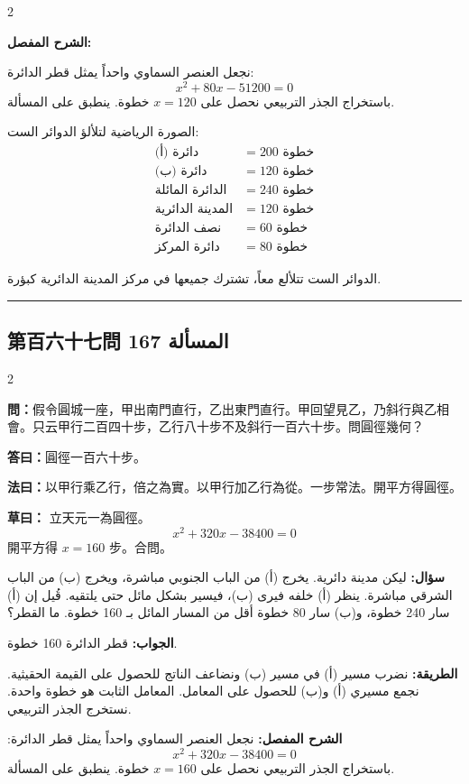 \documentclass[11pt,a4paper]{article}
\newcommand{\ar}[1]{\arabicfont\beginR #1\endR}
\newcommand{\arb}[1]{\textbf{\arabicfont\beginR #1\endR}}
\newcommand{\longline}{\noindent\rule{\textwidth}{0.4pt}}
\newcommand{\arnote}[1]{\textcolor{arabicblue}{\ar{#1}}}
\newcommand{\wen}[1]{\par\noindent\textbf{\textcolor{probcolor}{問：}}{#1}\par}
\newcommand{\da}[1]{\par\noindent\textbf{\textcolor{anscolor}{答曰：}}{#1}\par}
\newcommand{\fayue}[1]{\par\noindent\textbf{\textcolor{methodcolor}{法曰：}}{#1}\par}
\newcommand{\caoyue}[1]{\par\noindent\textbf{草曰：}{#1}\par}
\newcommand{\arwen}[1]{\par\noindent\arb{سؤال: }\arnote{#1}\par}
\newcommand{\arjwb}[1]{\par\noindent\arb{الجواب: }\arnote{#1}\par}
\newcommand{\arqwd}[1]{\par\noindent\arb{الطريقة: }\arnote{#1}\par}
\newcommand{\arshr}[1]{\par\noindent\arb{الشرح المفصل: }\arnote{#1}\par}
\begin{document}
\begin{paracol}{2}
\begin{rightcolumn}
\arshr{نجعل العنصر السماوي واحداً يمثل قطر الدائرة:
$$x^2 + 80x - 51200 = 0$$
باستخراج الجذر التربيعي نحصل على $x = 120$ خطوة. ينطبق على المسألة.

الصورة الرياضية لتلألؤ الدوائر الست:
\begin{align*}
\text{دائرة (أ)} &= 200 \text{ خطوة} \\
\text{دائرة (ب)} &= 120 \text{ خطوة} \\
\text{الدائرة المائلة} &= 240 \text{ خطوة} \\
\text{المدينة الدائرية} &= 120 \text{ خطوة} \\
\text{نصف الدائرة} &= 60 \text{ خطوة} \\
\text{دائرة المركز} &= 80 \text{ خطوة}
\end{align*}

الدوائر الست تتلألع معاً، تشترك جميعها في مركز المدينة الدائرية كبؤرة.}
\end{rightcolumn}

\end{paracol}

\vspace{0.3cm}
\longline

\subsection*{第百六十七問 \hfill \ar{المسألة 167}}

\begin{paracol}{2}

\begin{leftcolumn}
\wen{假令圓城一座，甲出南門直行，乙出東門直行。甲回望見乙，乃斜行與乙相會。只云甲行二百四十步，乙行八十步不及斜行一百六十步。問圓徑幾何？}

\da{圓徑一百六十步。}

\fayue{以甲行乘乙行，倍之為實。以甲行加乙行為從。一步常法。開平方得圓徑。}

\caoyue{
立天元一為圓徑。
$$x^2 + 320x - 38400 = 0$$
開平方得 $x = 160$ 步。合問。}
\end{leftcolumn}

\begin{rightcolumn}
\arwen{ليكن مدينة دائرية. يخرج (أ) من الباب الجنوبي مباشرة، ويخرج (ب) من الباب الشرقي مباشرة. ينظر (أ) خلفه فيرى (ب)، فيسير بشكل مائل حتى يلتقيه. قُيل إن (أ) سار 240 خطوة، و(ب) سار 80 خطوة أقل من المسار المائل بـ 160 خطوة. ما القطر؟}

\arjwb{قطر الدائرة 160 خطوة.}

\arqwd{نضرب مسير (أ) في مسير (ب) ونضاعف الناتج للحصول على القيمة الحقيثية. نجمع مسيري (أ) و(ب) للحصول على المعامل. المعامل الثابت هو خطوة واحدة. نستخرج الجذر التربيعي.}

\arshr{نجعل العنصر السماوي واحداً يمثل قطر الدائرة:
$$x^2 + 320x - 38400 = 0$$
باستخراج الجذر التربيعي نحصل على $x = 160$ خطوة. ينطبق على المسألة.}
\end{rightcolumn}

\end{paracol}
\end{document}
